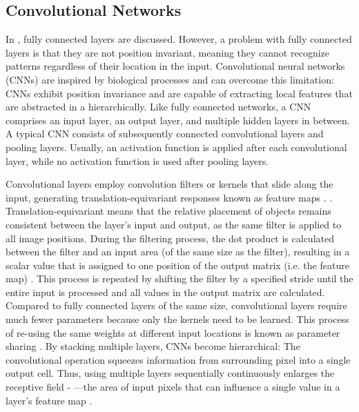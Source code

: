 \subsection{Convolutional Networks}
In , fully connected layers are discussed.
However, a problem with fully connected layers is that they are not position invariant, meaning they cannot recognize patterns regardless of their location in the input.
Convolutional neural networks (CNNs)  are inspired by biological processes  and can overcome this limitation: CNNs exhibit position invariance and are capable of extracting local features that are abstracted in a hierarchically.
Like fully connected networks, a CNN comprises an input layer, an output layer, and multiple hidden layers in between.
A typical CNN consists of subsequently connected convolutional layers and pooling layers.
Usually, an activation function is applied after each convolutional layer, while no activation function is used after pooling layers.

Convolutional layers employ convolution filters or kernels that slide along the input, generating translation-equivariant  responses known as feature maps .
. Translation-equivariant means that the relative placement of objects remains consistent between the layer's input and output, as the same filter is applied to all image positions.
During the filtering process, the dot product is calculated between the filter and an input area (of the same size as the filter), resulting in a scalar value that is assigned to one position of the output matrix (i.e. the feature map) \cite{goodfellow_deep_2016}.
This process is repeated by shifting the filter by a specified stride until the entire input is processed and all values in the output matrix are calculated.
Compared to fully connected layers of the same size, convolutional layers require much fewer parameters because only the kernels need to be learned.
This process of re-using the same weights at different input locations is known as parameter sharing \cite{gerber_stride_2020}.
By stacking multiple layers, CNNs become hierarchical: The convolutional operation squeezes information from surrounding pixel into a single output cell. Thus, using multiple layers sequentially continuously enlarges the receptive field - —the area of input pixels that can influence a single value in a layer's feature map .

